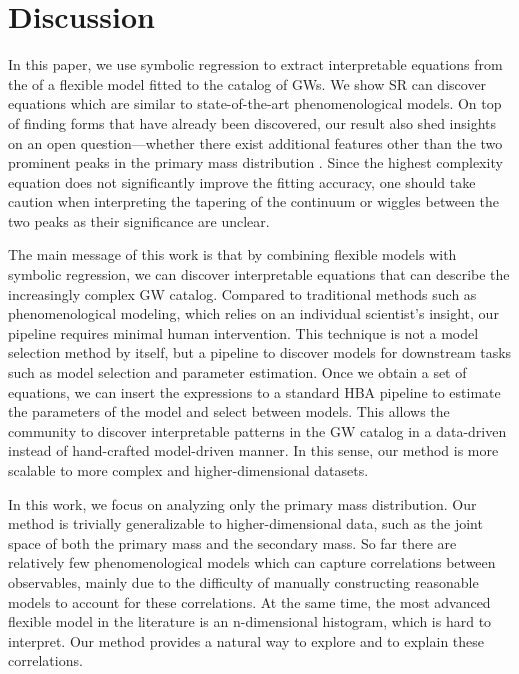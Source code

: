 \documentclass[nohyperref]{article}
\theoremstyle{plain}
\theoremstyle{definition}
\theoremstyle{remark}
\begin{document}
\section{Discussion}
\label{sec:discussion}

In this paper, we use symbolic regression to extract interpretable equations from the \ppd of a flexible model fitted to the catalog of GWs.
We show SR can discover equations which are similar to state-of-the-art phenomenological models.
On top of finding forms that have already been discovered,
our result also shed insights on an open question---whether there exist additional features other than the two prominent peaks in the primary mass distribution \cite{Tiwari:2021yvr}.
Since the highest complexity equation does not significantly improve the fitting accuracy, one should take caution when interpreting the tapering of the continuum or wiggles between the two peaks as their significance are unclear.

The main message of this work is that by combining flexible models with symbolic regression, we can discover interpretable equations that can describe the increasingly complex GW catalog.
Compared to traditional methods such as phenomenological modeling, which relies on an individual scientist's insight,
our pipeline requires minimal human intervention.
 This technique is not a model selection method by itself, but a pipeline to discover models for downstream tasks such as model selection and parameter estimation.
Once we obtain a set of equations, we can insert the expressions to a standard HBA pipeline to estimate the parameters of the model and select between models.
This allows the community to discover interpretable patterns in the GW catalog in a data-driven instead of hand-crafted model-driven manner.
In this sense, our method is more scalable to more complex and higher-dimensional datasets.

In this work, we focus on analyzing only the primary mass distribution.
Our method is trivially generalizable to higher-dimensional data, such as the joint space of both the primary mass and the secondary mass.
So far there are relatively few phenomenological models which can capture correlations between observables,
mainly due to the difficulty of manually constructing reasonable models to account for these correlations.
At the same time, the most advanced flexible model in the literature is an n-dimensional histogram, which is hard to interpret.
Our method provides a natural way to explore and to explain these correlations.
\end{document}
